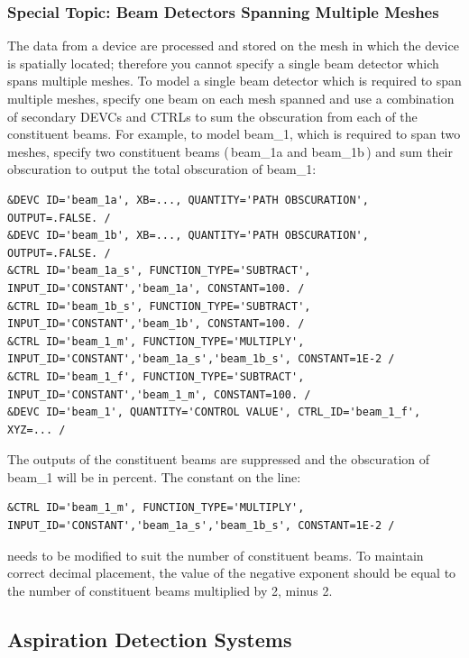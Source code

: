 \documentclass[11pt]{book}
\begin{document}
\subsubsection{Special Topic: Beam Detectors Spanning Multiple Meshes}
The data from a device are processed and stored on the mesh in which the device is spatially located; therefore you cannot specify a single beam detector which spans multiple meshes. To model a single beam detector which is required to span multiple meshes, specify one beam on each mesh spanned and use a combination of secondary {\ct DEVC}s and {\ct CTRL}s to sum the obscuration from each of the constituent beams. For example, to model {\ct beam\_1}, which is required to span two meshes, specify two constituent beams (\,{\ct beam\_1a} and {\ct beam\_1b}\,) and sum their obscuration to output the total obscuration of {\ct beam\_1}:
\begin{lstlisting}
&DEVC ID='beam_1a', XB=..., QUANTITY='PATH OBSCURATION', OUTPUT=.FALSE. /
&DEVC ID='beam_1b', XB=..., QUANTITY='PATH OBSCURATION', OUTPUT=.FALSE. /
&CTRL ID='beam_1a_s', FUNCTION_TYPE='SUBTRACT', INPUT_ID='CONSTANT','beam_1a', CONSTANT=100. /
&CTRL ID='beam_1b_s', FUNCTION_TYPE='SUBTRACT', INPUT_ID='CONSTANT','beam_1b', CONSTANT=100. /
&CTRL ID='beam_1_m', FUNCTION_TYPE='MULTIPLY', INPUT_ID='CONSTANT','beam_1a_s','beam_1b_s', CONSTANT=1E-2 /
&CTRL ID='beam_1_f', FUNCTION_TYPE='SUBTRACT', INPUT_ID='CONSTANT','beam_1_m', CONSTANT=100. /
&DEVC ID='beam_1', QUANTITY='CONTROL VALUE', CTRL_ID='beam_1_f', XYZ=... /
\end{lstlisting}
The outputs of the constituent beams are suppressed and the obscuration of {\ct beam\_1} will be in percent. The constant on the line:
\begin{lstlisting}
&CTRL ID='beam_1_m', FUNCTION_TYPE='MULTIPLY', INPUT_ID='CONSTANT','beam_1a_s','beam_1b_s', CONSTANT=1E-2 /
\end{lstlisting}
needs to be modified to suit the number of constituent beams. To maintain correct decimal placement, the value of the negative exponent should be equal to the number of constituent beams multiplied by \num{2}, minus \num{2}.
\subsection{Aspiration Detection Systems}
\label{info:aspiration_detector}
\end{document}
